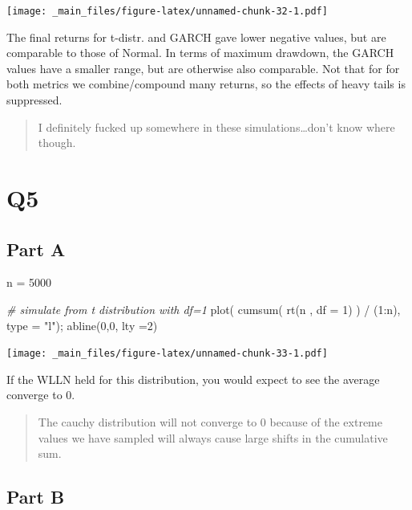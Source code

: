 \documentclass[
  oneside]{book}
\newenvironment{Shaded}{\begin{snugshade}}{\end{snugshade}}
\newcommand{\AttributeTok}[1]{\textcolor[rgb]{0.77,0.63,0.00}{#1}}
\newcommand{\CommentTok}[1]{\textcolor[rgb]{0.56,0.35,0.01}{\textit{#1}}}
\newcommand{\DecValTok}[1]{\textcolor[rgb]{0.00,0.00,0.81}{#1}}
\newcommand{\FunctionTok}[1]{\textcolor[rgb]{0.00,0.00,0.00}{#1}}
\newcommand{\NormalTok}[1]{#1}
\newcommand{\OtherTok}[1]{\textcolor[rgb]{0.56,0.35,0.01}{#1}}
\newcommand{\SpecialCharTok}[1]{\textcolor[rgb]{0.00,0.00,0.00}{#1}}
\newcommand{\StringTok}[1]{\textcolor[rgb]{0.31,0.60,0.02}{#1}}
\begin{document}
\texttt{[image: \_main\_files/figure-latex/unnamed-chunk-32-1.pdf]}

The final returns for t-distr. and GARCH gave lower negative values, but are comparable to those of Normal. In terms of maximum drawdown, the GARCH values have a smaller range, but are otherwise also comparable. Not that for for both metrics we combine/compound many returns, so the effects of heavy tails is suppressed.

\begin{quote}
I definitely fucked up somewhere in these simulations\ldots don't know where though.
\end{quote}

\hypertarget{q5}{%
\section{Q5}\label{q5}}

\hypertarget{part-a-2}{%
\subsection{Part A}\label{part-a-2}}

\begin{Shaded}
\begin{Highlighting}[]
\NormalTok{n }\OtherTok{=} \DecValTok{5000}

\CommentTok{\# simulate from t distribution with df=1}
\FunctionTok{plot}\NormalTok{( }\FunctionTok{cumsum}\NormalTok{( }\FunctionTok{rt}\NormalTok{(n , }\AttributeTok{df =} \DecValTok{1}\NormalTok{) ) }\SpecialCharTok{/}\NormalTok{ (}\DecValTok{1}\SpecialCharTok{:}\NormalTok{n), }\AttributeTok{type =} \StringTok{"l"}\NormalTok{); }
\FunctionTok{abline}\NormalTok{(}\DecValTok{0}\NormalTok{,}\DecValTok{0}\NormalTok{, }\AttributeTok{lty =}\DecValTok{2}\NormalTok{)}
\end{Highlighting}
\end{Shaded}

\texttt{[image: \_main\_files/figure-latex/unnamed-chunk-33-1.pdf]}

If the WLLN held for this distribution, you would expect to see the average converge to 0.

\begin{quote}
The cauchy distribution will not converge to 0 because of the extreme values we have sampled will always cause large shifts in the cumulative sum.
\end{quote}

\hypertarget{part-b-2}{%
\subsection{Part B}\label{part-b-2}}
\end{document}
